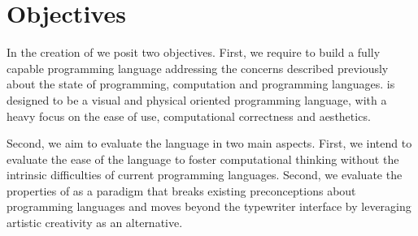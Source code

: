 \section{Objectives}
\label{sec:objectives}
In the creation of \sculpt we posit two objectives.
First, we require to build a fully capable programming language addressing the concerns described previously about the state of programming, computation and programming languages.
\sculpt is designed to be a visual and physical oriented programming language, with a heavy focus on the ease of use, computational correctness and aesthetics.

Second, we aim to evaluate the language in two main aspects.
First, we intend to evaluate the ease of the language to foster computational thinking without the intrinsic difficulties of current programming languages.
Second, we evaluate the properties of \sculpt as a paradigm that breaks existing preconceptions about programming languages and moves beyond 
the typewriter interface by leveraging artistic creativity as an alternative.
\endinput